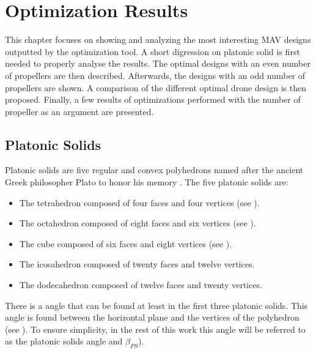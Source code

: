 \chapter{Optimization Results}
\label{sec:optimization_results}
This chapter focuses on showing and analyzing the most interesting MAV designs
outputted by the optimization tool. A short digression on platonic solid is first
needed to properly analyse the results. The optimal designs with an even number
of propellers are then described. Afterwards, the designs with an odd number of
propellers are shown. A comparison of the different optimal drone design is then
proposed. Finally, a few results of optimizations performed with the number of
propeller as an argument are presented.

\section{Platonic Solids}
\label{sec:platonic_solids}
Platonic solids are five regular and convex polyhedrons named after the
ancient Greek philosopher Plato to honor his memory \citep{noauthor_platonic_2018}.
The five platonic solids are:
\begin{itemize}
\item The tetrahedron composed of four faces and four vertices (see ).
\item The octahedron composed of eight faces and six vertices (see ).
\item The cube composed of six faces and eight vertices (see ).
\item The icosahedron composed of twenty faces and twelve vertices.
\item The dodecahedron composed of twelve faces and twenty vertices.
\end{itemize}
There is a angle that can be found at least in the
first three platonic solids. This angle is found between the horizontal plane and
the vertices of the polyhedron (see ). To ensure simplicity,
in the rest of this work this angle will be referred to as the platonic solids angle
and $\beta_{PS}$).

